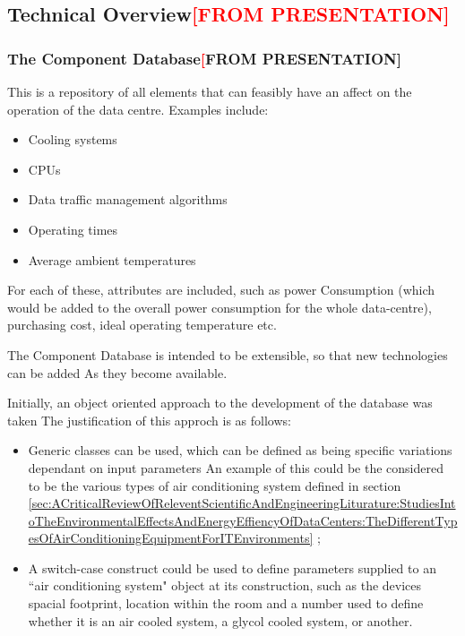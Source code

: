 \subsection{Technical Overview\textcolor{red}{[FROM PRESENTATION]}}
\label{sec:Methodology:TechnicalOverview}
\subsubsection{The Component Database\textcolor{red}[FROM PRESENTATION]}
\label{sec:Methodology:TechnicalOverview:TheComponentDatabase}
This is a repository of all elements that can feasibly have an affect 
on the operation of the data centre. Examples include:

\begin{itemize}
\item Cooling systems
\item CPUs
\item Data traffic management algorithms
\item Operating times
\item Average ambient temperatures
\end{itemize}

For each of these, attributes are included, such as power
Consumption (which would be added to the overall power
consumption for the whole data-centre), purchasing cost, ideal operating 
temperature etc.

The Component Database is intended to be extensible, so that 
new technologies can be added As they become available.

Initially, an object oriented approach to the development of the database was taken
The justification of this approch is as follows:

\begin{itemize}

\item Generic classes can be used, which can be defined as being specific variations
 dependant on input parameters An example of this could be the considered to be the various
types of air conditioning system defined in section \ref{sec:ACriticalReviewOfReleventScientificAndEngineeringLiturature:StudiesIntoTheEnvironmentalEffectsAndEnergyEffiencyOfDataCenters:TheDifferentTypesOfAirConditioningEquipmentForITEnvironments}
\cite{TonyEvansTheDifferentTypesOfAirConditioningEquipmentForITEnvironmentsWhitePaper};

\item A switch-case construct could be used to define parameters supplied to an ``air conditioning system"
object at its construction, such as the devices spacial footprint, location within the room and a number 
used to define whether it is an air cooled system, a glycol cooled system, or another.

\end{itemize}

